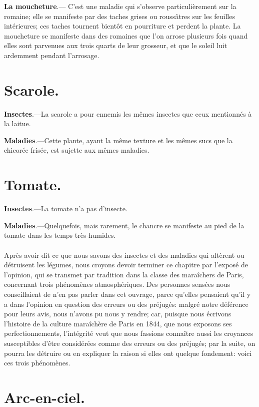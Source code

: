 \documentclass[10pt,a4paper]{book}
\begin{document}
\textbf{La moucheture}.--- C'est une maladie qui s'observe particulièrement sur la romaine; elle se manifeste par des taches grises ou roussâtres sur les feuilles intérieures; ces taches tournent bientôt en pourriture et perdent la plante. La moucheture se manifeste dans des romaines que l'on arrose plusieurs fois quand elles sont parvenues aux trois quarts de leur grosseur, et que le soleil luit ardemment pendant l'arrosage.

\section{Scarole.}

\textbf{Insectes}.---La scarole a pour ennemis les mêmes insectes que ceux mentionnés à la laitue.

\textbf{Maladies}.---Cette plante, ayant la même texture et les mêmes sucs que la chicorée frisée, est sujette aux mêmes maladies.

\section{Tomate.}

\textbf{Insectes}.---La tomate n'a pas d'insecte.

\textbf{Maladies}.---Quelquefois, mais rarement, le chancre se manifeste au pied de la tomate dans les temps très-humides.
\\\\

Après avoir dit ce que nous savons des insectes et des maladies qui altèrent ou détruisent les légumes, nous croyons devoir terminer ce chapitre par l'exposé de l'opinion, qui se transmet par tradition dans la classe des maraîchers de Paris, concernant trois phénomènes atmosphériques. Des personnes sensées nous conseillaient de n'en pas parler dans cet ouvrage, parce qu'elles pensaient qu'il y a dans l'opinion en question des erreurs ou des préjugés: malgré notre déférence pour leurs avis, nous n'avons pu nous y rendre; car, puisque nous écrivons l'histoire de la culture maraîchère de Paris en 1844, que nous exposons ses perfectionnements, l'intégrité veut que nous fassions connaître aussi les croyances susceptibles d'être considérées comme des erreurs ou des préjugés; par la suite, on pourra les détruire ou en expliquer la raison si elles ont quelque fondement: voici ces trois phénomènes.

\section{Arc-en-ciel.}
\end{document}
